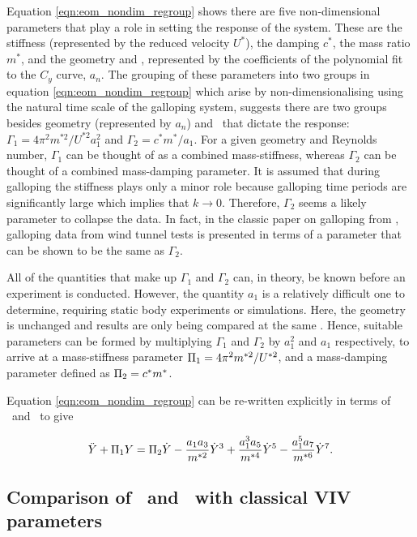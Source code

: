 Equation \ref{eqn:eom_nondim_regroup} shows there are five non-dimensional parameters that play a role in setting the response of the system. These are the stiffness (represented by the reduced velocity $U^*$), the damping $c^*$, the mass ratio $m^*$, and the geometry and \reynoldsnumber, represented by the coefficients of the polynomial fit to the $C_y$ curve, $a_n$. The grouping of these parameters into two groups in equation \ref{eqn:eom_nondim_regroup} which arise by non-dimensionalising using the natural time scale of the galloping system, suggests there are two groups besides geometry (represented by $a_n$) and \reynoldsnumber\ that dictate the response: $\Gamma_1 = 4\pi^2m^{*2}/U^{*2}a_1^2$ and $\Gamma_2 = c^*m^*/a_1$. For a given geometry and Reynolds number, $\Gamma_1$ can be thought of as a combined mass-stiffness, whereas $\Gamma_2$ can be thought of a combined mass-damping parameter. It is assumed that during galloping the stiffness plays only a minor role because galloping time periods are significantly large which implies that $k \rightarrow 0$. Therefore, $\Gamma_2$ seems a likely parameter to collapse the data. In fact, in the classic paper on galloping from \cite{Parkinson1964}, galloping data from wind tunnel tests is presented in terms of a parameter that can be shown to be the same as $\Gamma_2$.

All of the quantities that make up $\Gamma_1$ and $\Gamma_2$ can, in theory, be known before an experiment is conducted. However, the quantity $a_1$ is a relatively difficult one to determine, requiring static body experiments or simulations. Here, the geometry is unchanged and results are only being compared at the same \reynoldsnumber. Hence, suitable parameters can be formed by multiplying $\Gamma_1$ and $\Gamma_2$ by $a_1^2$ and $a_1$ respectively, to arrive at a mass-stiffness parameter $\Pi_1 =  4\pi^2m^{*2}/U^{*2}$, and a mass-damping parameter defined as $\Pi_2 = c^*m^*$.

Equation \ref{eqn:eom_nondim_regroup} can be re-written explicitly in terms of \massstiff \ and \massdamp\ to give

\begin{equation}
	\label{eqn:eom_nondim_regroup_pi_1_pi_2}
	\ddot{Y} + \Pi_1 Y = \Pi_2 \dot{Y} - \frac{a_1a_3}{m^{*2}}\dot{Y}^3 + \frac{a_1^3a_5}{m^{*4}}\dot{Y}^5 - \frac{a_1^5a_7}{m^{*6}}\dot{Y}^7.
\end{equation} 

 
 
 \subsection{Comparison of \massstiff \ and \massdamp \ with classical VIV parameters}
 \label{sec:new_vs_viv}
 
